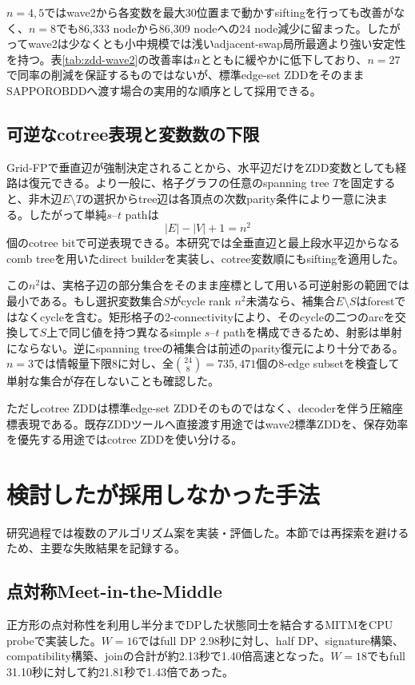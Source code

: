 \documentclass[a4paper,10pt,twocolumn]{ltjsarticle}
\begin{document}
$n=4,5$ではwave2から各変数を最大30位置まで動かすsiftingを行っても改善がなく、$n=8$でも86,333 nodeから86,309 nodeへの24 node減少に留まった。したがってwave2は少なくとも小中規模では浅いadjacent-swap局所最適より強い安定性を持つ。表\ref{tab:zdd-wave2}の改善率は$n$とともに緩やかに低下しており、$n=27$で同率の削減を保証するものではないが、標準edge-set ZDDをそのままSAPPOROBDDへ渡す場合の実用的な順序として採用できる。

\subsection{可逆なcotree表現と変数数の下限}
Grid-FPで垂直辺が強制決定されることから、水平辺だけをZDD変数としても経路は復元できる。より一般に、格子グラフの任意のspanning tree $T$を固定すると、非木辺$E\setminus T$の選択からtree辺は各頂点の次数parity条件により一意に決まる。したがって単純$s$--$t$ pathは
\[
|E|-|V|+1=n^2
\]
個のcotree bitで可逆表現できる。本研究では全垂直辺と最上段水平辺からなるcomb treeを用いたdirect builderを実装し、cotree変数順にもsiftingを適用した。

この$n^2$は、実格子辺の部分集合をそのまま座標として用いる可逆射影の範囲では最小である。もし選択変数集合$S$がcycle rank $n^2$未満なら、補集合$E\setminus S$はforestではなくcycleを含む。矩形格子の2-connectivityにより、そのcycleの二つのarcを交換して$S$上で同じ値を持つ異なるsimple $s$--$t$ pathを構成できるため、射影は単射にならない。逆にspanning treeの補集合は前述のparity復元により十分である。$n=3$では情報量下限8に対し、全$\binom{24}{8}=735{,}471$個の8-edge subsetを検査して単射な集合が存在しないことも確認した。

ただしcotree ZDDは標準edge-set ZDDそのものではなく、decoderを伴う圧縮座標表現である。既存ZDDツールへ直接渡す用途ではwave2標準ZDDを、保存効率を優先する用途ではcotree ZDDを使い分ける。

\section{検討したが採用しなかった手法}
研究過程では複数のアルゴリズム案を実装・評価した。本節では再探索を避けるため、主要な失敗結果を記録する。

\subsection{点対称Meet-in-the-Middle}
正方形の点対称性を利用し半分までDPした状態同士を結合するMITMをCPU probeで実装した。$W=16$ではfull DP 2.98秒に対し、half DP、signature構築、compatibility構築、joinの合計が約2.13秒で1.40倍高速となった。$W=18$でもfull 31.10秒に対して約21.81秒で1.43倍であった。
\end{document}
